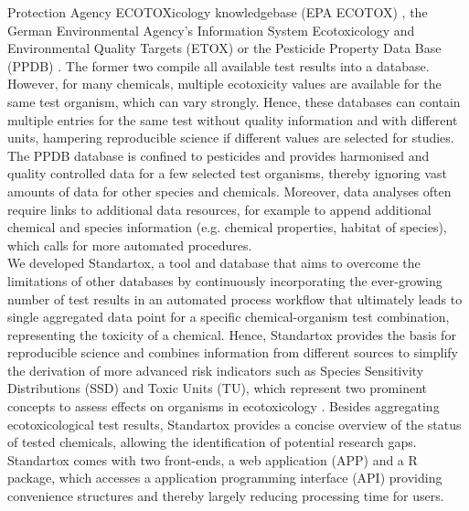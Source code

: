 Protection Agency ECOTOXicology knowledgebase (EPA ECOTOX) \citep{elonen_ecotoxicology_2018}, the German Environmental Agency's Information System Ecotoxicology and Environmental Quality Targets (ETOX) \citep{umweltbundesamt_etox_2019} or the Pesticide Property Data Base (PPDB) \citep{lewis_international_2016}. The former two compile all available test results into a database. However, for many chemicals, multiple ecotoxicity values are available for the same test organism, which can vary strongly. Hence, these databases can contain multiple entries for the same test without quality information and with different units, hampering reproducible science if different values are selected for studies. The PPDB database is confined to pesticides and provides harmonised and quality controlled data for a few selected test organisms, thereby ignoring vast amounts of data for other species and chemicals. Moreover, data analyses often require links to additional data resources, for example to append additional chemical and species information (e.g. chemical properties, habitat of species), which calls for more automated procedures.\\

We developed Standartox, a tool and database that aims to overcome the limitations of other databases by continuously incorporating the ever-growing number of test results in an automated process workflow that ultimately leads to single aggregated data point for a specific chemical-organism test combination, representing the toxicity of a chemical. Hence, Standartox provides the basis for reproducible science and combines information from different sources to simplify the derivation of more advanced risk indicators such as Species Sensitivity Distributions (SSD) and Toxic Units (TU), which represent two prominent concepts to assess effects on organisms in ecotoxicology \citep{posthuma_species_2002, kefford_definition_2011, schafer_effects_2011}. Besides aggregating ecotoxicological test results, Standartox provides a concise overview of the status of tested chemicals, allowing the identification of potential research gaps. Standartox comes with two front-ends,  a web application (APP) and a R \citep{rcoreteam_language_2017} package, which accesses a application programming interface (API) providing convenience structures and thereby largely reducing processing time for users.

\iffalse



